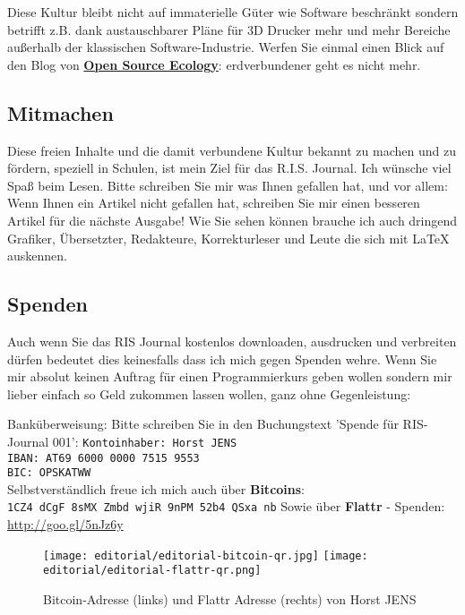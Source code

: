 Diese Kultur bleibt nicht auf immaterielle Güter wie Software beschränkt sondern betrifft z.B. dank austauschbarer Pläne für 3D Drucker mehr und mehr Bereiche außerhalb der klassischen Software-Industrie. Werfen Sie einmal einen Blick auf den Blog von \href{http://opensourceecology.org/}{\textbf{Open Source Ecology}}: erdverbundener geht es nicht mehr. 

\subsection*{Mitmachen}
Diese freien Inhalte und die damit verbundene Kultur bekannt zu machen und zu fördern, speziell in Schulen, ist mein Ziel für das R.I.S. Journal. Ich wünsche viel Spaß beim Lesen. Bitte schreiben Sie mir was Ihnen gefallen hat, und vor allem: Wenn Ihnen ein Artikel nicht gefallen hat, schreiben Sie mir einen besseren Artikel für die nächste Ausgabe! Wie Sie sehen können brauche ich auch dringend Grafiker, Übersetzter, Redakteure, Korrekturleser und Leute die sich mit {\large \LaTeX} auskennen. 

\subsection*{Spenden}
Auch wenn Sie das RIS Journal kostenlos downloaden, ausdrucken und verbreiten dürfen bedeutet dies keinesfalls dass ich mich gegen Spenden wehre. Wenn Sie mir absolut keinen Auftrag für einen Programmierkurs geben wollen sondern mir lieber einfach so Geld zukommen lassen wollen, ganz ohne Gegenleistung:


Banküberweisung: Bitte schreiben Sie in den Buchungstext 'Spende für RIS-Journal 001':
\texttt{Kontoinhaber: Horst JENS \\
IBAN: AT69 6000 0000 7515 9553\\
BIC: OPSKATWW} \\
Selbstverständlich freue ich mich auch über \textbf{Bitcoins}:\\
\texttt{1CZ4 dCgF 8sMX Zmbd wjiR 9nPM 52b4 QSxa nb}
Sowie über \textbf{Flattr} - Spenden: \url{http://goo.gl/5nJz6y}
\begin{figure}
\texttt{[image: editorial/editorial-bitcoin-qr.jpg]} 
\texttt{[image: editorial/editorial-flattr-qr.png]}
\caption{Bitcoin-Adresse (links) und Flattr Adresse (rechts) von Horst JENS}
\end{figure}

